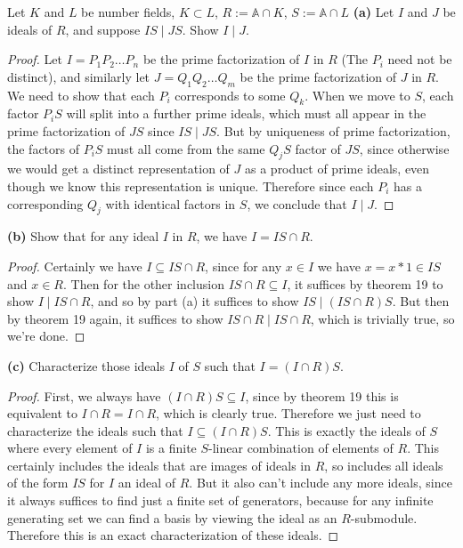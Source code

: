 \documentclass[11pt]{article}
\begin{document}
Let $K$ and $L$ be number fields, $K \subset L$, $R := \mathbb{A} \cap K$, $S := \mathbb{A} \cap L$
\textbf{(a)} Let $I$ and $J$ be ideals of $R$, and suppose $IS \mid JS$. Show $I \mid J$.

\begin{proof}
  Let $I = P_1P_2 \dots P_n$ be the prime factorization of $I$ in $R$ (The $P_i$ need not be distinct), and similarly let $J = Q_1Q_2 \dots Q_m$ be the prime factorization of $J$ in $R$.
  We need to show that each $P_i$ corresponds to some $Q_k$.
  When we move to $S$, each factor $P_iS$ will split into a further prime ideals, which must all appear in the prime factorization of $JS$ since $IS \mid JS$.
  But by uniqueness of prime factorization, the factors of $P_iS$ must all come from the same $Q_jS$ factor of $JS$, since otherwise we would get a distinct representation of $J$ as a product of prime ideals, even though we know this representation is unique.
  Therefore since each $P_i$ has a corresponding $Q_j$ with identical factors in $S$, we conclude that $I \mid J$.  
\end{proof}

\textbf{(b)} Show that for any ideal $I$ in $R$, we have $I = IS \cap R$.

\begin{proof}
  Certainly we have $I \subseteq IS \cap R$, since for any $x \in I$ we have $x = x*1 \in IS$ and $x \in R$.
  Then for the other inclusion $IS \cap R \subseteq I$, it suffices by theorem 19 to show $I \mid IS \cap R$, and so by part (a) it suffices to show $IS \mid (IS \cap R)S$.
  But then by theorem 19 again, it suffices to show $IS \cap R \mid IS \cap R$, which is trivially true, so we're done.
\end{proof}

\textbf{(c)} Characterize those ideals $I$ of $S$ such that $I = (I \cap R)S$.

\begin{proof}
  First, we always have $(I \cap R)S \subseteq I$, since by theorem 19 this is equivalent to $I \cap R = I \cap R$, which is clearly true.
  Therefore we just need to characterize the ideals such that $I \subseteq (I \cap R)S$.
  This is exactly the ideals of $S$ where every element of $I$ is a finite $S$-linear combination of elements of $R$.
  This certainly includes the ideals that are images of ideals in $R$, so includes all ideals of the form $IS$ for $I$ an ideal of $R$.
  But it also can't include any more ideals, since it always suffices to find just a finite set of generators, because for any infinite generating set we can find a basis by viewing the ideal as an $R$-submodule.
  Therefore this is an exact characterization of these ideals.
\end{proof}
\end{document}
